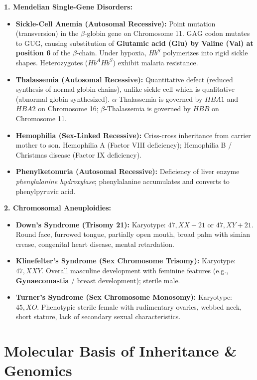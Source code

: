 \documentclass[10pt,twoside,openright]{book}
\begin{document}
\begin{trapbox}
\textbf{1. Mendelian Single-Gene Disorders:}
\begin{itemize}[leftmargin=*]
  \item \textbf{Sickle-Cell Anemia (Autosomal Recessive):} Point mutation (transversion) in the $\beta$-globin gene on Chromosome 11. $\mathrm{GAG}$ codon mutates to $\mathrm{GUG}$, causing substitution of \textbf{Glutamic acid (Glu) by Valine (Val) at position 6} of the $\beta$-chain. Under hypoxia, $Hb^S$ polymerizes into rigid sickle shapes. Heterozygotes ($Hb^A Hb^S$) exhibit malaria resistance.
  \item \textbf{Thalassemia (Autosomal Recessive):} Quantitative defect (reduced synthesis of normal globin chains), unlike sickle cell which is qualitative (abnormal globin synthesized). $\alpha$-Thalassemia is governed by $HBA1$ and $HBA2$ on Chromosome 16; $\beta$-Thalassemia is governed by $HBB$ on Chromosome 11.
  \item \textbf{Hemophilia (Sex-Linked Recessive):} Criss-cross inheritance from carrier mother to son. Hemophilia A (Factor VIII deficiency); Hemophilia B / Christmas disease (Factor IX deficiency).
  \item \textbf{Phenylketonuria (Autosomal Recessive):} Deficiency of liver enzyme \textit{phenylalanine hydroxylase}; phenylalanine accumulates and converts to phenylpyruvic acid.
\end{itemize}

\textbf{2. Chromosomal Aneuploidies:}
\begin{itemize}[leftmargin=*]
  \item \textbf{Down's Syndrome (Trisomy 21):} Karyotype: $47, XX+21$ or $47, XY+21$. Round face, furrowed tongue, partially open mouth, broad palm with simian crease, congenital heart disease, mental retardation.
  \item \textbf{Klinefelter's Syndrome (Sex Chromosome Trisomy):} Karyotype: $47, XXY$. Overall masculine development with feminine features (e.g., \textbf{Gynaecomastia} / breast development); sterile male.
  \item \textbf{Turner's Syndrome (Sex Chromosome Monosomy):} Karyotype: $45, XO$. Phenotypic sterile female with rudimentary ovaries, webbed neck, short stature, lack of secondary sexual characteristics.
\end{itemize}
\end{trapbox}

\chapter{Molecular Basis of Inheritance \& Genomics}
\end{document}
